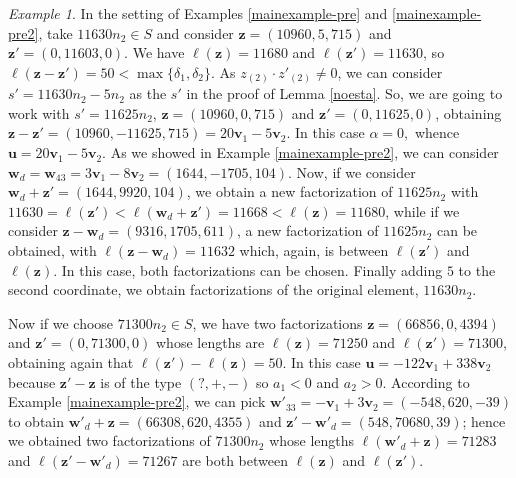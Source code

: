 \documentclass[11pt]{amsart}
\theoremstyle{remark}
\newtheorem{example}[theorem]{Example}
\begin{document}
\begin{example}
In the setting of Examples \ref{mainexample-pre} and \ref{mainexample-pre2}, take $11630n_2\in S$ and consider $\mathbf z=(10960,5,715)$ and $\mathbf z'=(0,11603,0)$. We have $\ell(\mathbf z)=11680$ and $\ell(\mathbf z')=11630$, so $\ell(\mathbf z -\mathbf z')=50<\max\{\delta_1,\delta_2\}$. As $z_{(2)}\cdot z'_{(2)}\neq 0$, we can consider $s'=11630n_2-5n_2$ as the $s'$ in the proof of Lemma \ref{noesta}. So, we are going to work with $s'=11625n_2$, $\mathbf z=(10960,0,715)$ and $\mathbf z'=(0,11625,0)$, obtaining $\mathbf z-\mathbf z'=(10960,-11625,715)=20\mathbf v_1-5\mathbf v_2$. In this case $\alpha=0,$ whence $\mathbf u=20\mathbf v_1-5\mathbf v_2$. As we showed in Example \ref{mainexample-pre2}, we can consider $\mathbf w_d=\mathbf w_{43}=3\mathbf v_1-8\mathbf v_2=(1644,-1705,104)$. Now, if we consider $\mathbf w_d+\mathbf z'=(1644,9920,104)$, we obtain a new factorization of $11625n_2$ with $11630=\ell(\mathbf z')<\ell(\mathbf w_d+\mathbf z')=11668<\ell(\mathbf z)=11680$, while if we consider $\mathbf z-\mathbf w_d=(9316,1705,611)$, a new factorization of $11625n_2$ can be obtained, with $\ell(\mathbf z-\mathbf w_d)=11632$ which, again, is between $\ell(\mathbf z')$ and $\ell(\mathbf z)$. In this case, both factorizations can be chosen. Finally adding $5$ to the second coordinate, we obtain factorizations of the original element, $11630n_2$.

Now if we choose $71300n_2\in S$, we have two factorizations $\mathbf z=(66856,0,4394)$ and $\mathbf z'=(0,71300,0)$ whose lengths are $\ell(\mathbf z)=71250$ and $\ell(\mathbf z')=71300$, obtaining again that $\ell(\mathbf z')-\ell(\mathbf z)=50$. In this case $\mathbf u=-122\mathbf v_1+338\mathbf v_2$ because $\mathbf z'-\mathbf z$ is of the type $(?,+,-)$ so $a_1<0$ and $a_2>0$. According to Example \ref{mainexample-pre2}, we can pick $\mathbf w'_{33}=-\mathbf v_1+3\mathbf v_2=(-548,620,-39)$ to obtain $\mathbf w'_d+\mathbf z=(66308,620,4355)$ and $\mathbf z'-\mathbf w'_d=(548,70680,39)$; hence we obtained two factorizations of $71300n_2$ whose lengths $\ell(\mathbf w'_d+\mathbf z)=71283$ and $\ell(\mathbf z'-\mathbf w'_d)=71267$ are both between $\ell(\mathbf z)$ and $\ell(\mathbf z')$.
\end{example}
\end{document}
